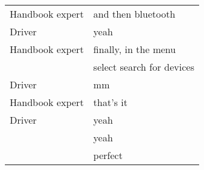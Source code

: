 \begin{table}[H]
\begin{tabular}{p{3cm}p{8cm}}
Handbook expert & and then bluetooth                                                                                                    \\
Driver          & yeah                                                                                                                  \\
Handbook expert & finally, in the menu                                                                                                  \\
 & select search for devices                                                                                             \\
Driver          & mm                                                                                                                    \\
Handbook expert & that's it                                                                                                             \\
Driver          & yeah                                                                                                                  \\
          & yeah                                                                                                                  \\
          & perfect                          

\end{tabular}

\end{table}